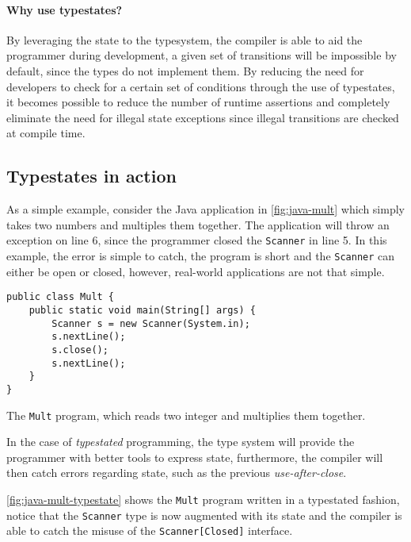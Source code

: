 \paragraph{Why use typestates?}
By leveraging the state to the typesystem, the compiler is able to aid the programmer during development,
a given set of transitions will be impossible by default, since the types do not implement them. %
By reducing the need for developers to check for a certain set of conditions through the use of typestates,
it becomes possible to reduce the number of runtime assertions and
completely eliminate the need for illegal state exceptions since illegal transitions are checked at compile time.


\subsection{Typestates in action}

As a simple example, consider the Java application in \autoref{fig:java-mult} which simply takes two numbers and multiples them together.
The application will throw an exception on line 6,
since the programmer closed the \texttt{Scanner} in line 5.
In this example, the error is simple to catch,
the program is short and the \texttt{Scanner} can either be open or closed,
however, real-world applications are not that simple.

\begin{listing}
    \centering
    \begin{verbatim}
public class Mult {
    public static void main(String[] args) {
        Scanner s = new Scanner(System.in);
        s.nextLine();
        s.close();
        s.nextLine();
    }
}
    \end{verbatim}
    \caption{The \texttt{Mult} program, which reads two integer and multiplies them together.}
    \label{fig:java-mult}
\end{listing}

In the case of \emph{typestated} programming,
the type system will provide the programmer with better tools to express state,
furthermore, the compiler will then catch errors regarding state,
such as the previous \emph{use-after-close}.

\autoref{fig:java-mult-typestate} shows the \texttt{Mult} program written in a typestated fashion,
notice that the \texttt{Scanner} type is now augmented with its state and
the compiler is able to catch the misuse of the \texttt{Scanner[Closed]} interface.


